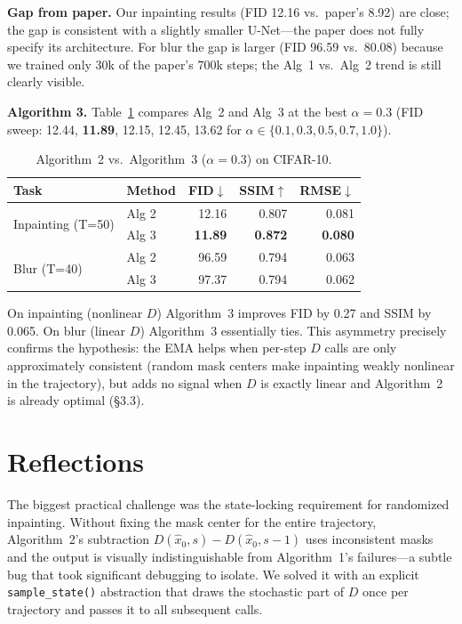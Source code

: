 \documentclass[11pt]{article}
\begin{document}
\noindent\textbf{Gap from paper.}
Our inpainting results (FID 12.16 vs.\ paper's 8.92) are close; the gap is consistent with
a slightly smaller U-Net---the paper does not fully specify its architecture. For blur the
gap is larger (FID 96.59 vs.\ 80.08) because we trained only 30k of the paper's 700k steps;
the Alg~1 vs.\ Alg~2 trend is still clearly visible.

\noindent\textbf{Algorithm 3.}
Table~\ref{tab:alg3} compares Alg~2 and Alg~3 at the best $\alpha{=}0.3$
(FID sweep: 12.44, \textbf{11.89}, 12.15, 12.45, 13.62 for $\alpha \in \{0.1, 0.3, 0.5, 0.7, 1.0\}$).

\begin{table}[h!]
\centering
\caption{Algorithm~2 vs.\ Algorithm~3 ($\alpha{=}0.3$) on CIFAR-10.}
\label{tab:alg3}
\vspace{3pt}
\small
\begin{tabular}{llrrr}
\toprule
Task & Method & FID$\downarrow$ & SSIM$\uparrow$ & RMSE$\downarrow$ \\
\midrule
\multirow{2}{*}{Inpainting (T=50)} & Alg 2 & 12.16 & 0.807 & 0.081 \\
                                    & Alg 3 & \textbf{11.89} & \textbf{0.872} & \textbf{0.080} \\
\midrule
\multirow{2}{*}{Blur (T=40)}       & Alg 2 & 96.59 & 0.794 & 0.063 \\
                                    & Alg 3 & 97.37 & 0.794 & 0.062 \\
\bottomrule
\end{tabular}
\end{table}

\noindent On inpainting (nonlinear $D$) Algorithm~3 improves FID by 0.27 and SSIM by 0.065.
On blur (linear $D$) Algorithm~3 essentially ties. This asymmetry precisely confirms the
hypothesis: the EMA helps when per-step $D$ calls are only approximately consistent
(random mask centers make inpainting weakly nonlinear in the trajectory), but adds no signal
when $D$ is exactly linear and Algorithm~2 is already optimal (§3.3).

\section{Reflections}

The biggest practical challenge was the state-locking requirement for randomized inpainting.
Without fixing the mask center for the entire trajectory, Algorithm~2's subtraction
$D(\hat{x}_0, s) - D(\hat{x}_0, s{-}1)$ uses inconsistent masks and the output is visually
indistinguishable from Algorithm~1's failures---a subtle bug that took significant debugging
to isolate. We solved it with an explicit \texttt{sample\_state()} abstraction that draws
the stochastic part of $D$ once per trajectory and passes it to all subsequent calls.
\end{document}
